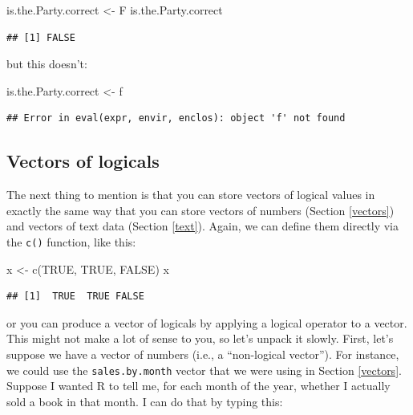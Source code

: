 \documentclass[
]{book}
\newenvironment{Shaded}{\begin{snugshade}}{\end{snugshade}}
\newcommand{\ConstantTok}[1]{\textcolor[rgb]{0.00,0.00,0.00}{#1}}
\newcommand{\FunctionTok}[1]{\textcolor[rgb]{0.00,0.00,0.00}{#1}}
\newcommand{\NormalTok}[1]{#1}
\newcommand{\OtherTok}[1]{\textcolor[rgb]{0.56,0.35,0.01}{#1}}
\begin{document}
\begin{Shaded}
\begin{Highlighting}[]
\NormalTok{is.the.Party.correct }\OtherTok{\textless{}{-}}\NormalTok{ F}
\NormalTok{is.the.Party.correct}
\end{Highlighting}
\end{Shaded}

\begin{verbatim}
## [1] FALSE
\end{verbatim}

but this doesn't:

\begin{Shaded}
\begin{Highlighting}[]
\NormalTok{is.the.Party.correct }\OtherTok{\textless{}{-}}\NormalTok{ f}
\end{Highlighting}
\end{Shaded}

\begin{verbatim}
## Error in eval(expr, envir, enclos): object 'f' not found
\end{verbatim}

\hypertarget{vectors-of-logicals}{%
\subsection{Vectors of logicals}\label{vectors-of-logicals}}

The next thing to mention is that you can store vectors of logical values in exactly the same way that you can store vectors of numbers (Section \ref{vectors}) and vectors of text data (Section \ref{text}). Again, we can define them directly via the \texttt{c()} function, like this:

\begin{Shaded}
\begin{Highlighting}[]
\NormalTok{x }\OtherTok{\textless{}{-}} \FunctionTok{c}\NormalTok{(}\ConstantTok{TRUE}\NormalTok{, }\ConstantTok{TRUE}\NormalTok{, }\ConstantTok{FALSE}\NormalTok{)}
\NormalTok{x}
\end{Highlighting}
\end{Shaded}

\begin{verbatim}
## [1]  TRUE  TRUE FALSE
\end{verbatim}

or you can produce a vector of logicals by applying a logical operator to a vector. This might not make a lot of sense to you, so let's unpack it slowly. First, let's suppose we have a vector of numbers (i.e., a ``non-logical vector''). For instance, we could use the \texttt{sales.by.month} vector that we were using in Section \ref{vectors}. Suppose I wanted R to tell me, for each month of the year, whether I actually sold a book in that month. I can do that by typing this:
\end{document}

